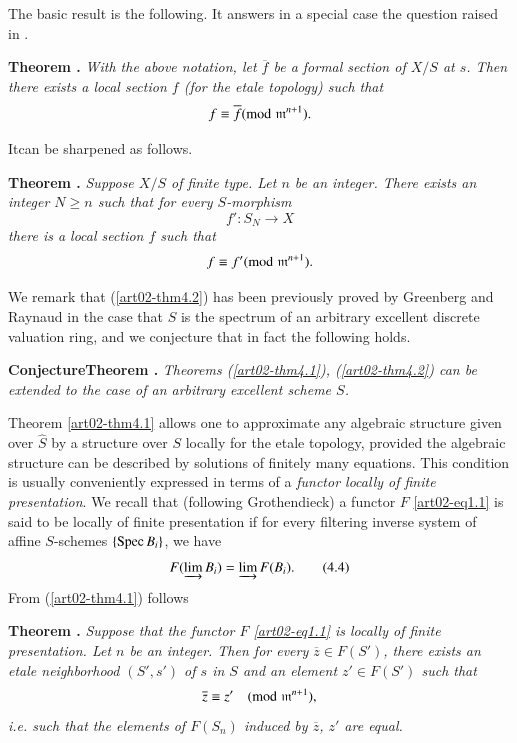The basic result is the following. It answers in a special case the question raised in \cite{art02-key3}.

\medskip
\noindent
{\bf Theorem .\label{art02-thm4.1}}
{\em With the above notation, let $\overline{f}$ be a formal section of $X/S$ at $s$. Then there exists a local section $f$ (for the etale topology) such that}
$$
f\equiv \overline{f}({\rm{mod}}\kern.3em \mathfrak{m}^{n+1}).
$$
\smallskip

It\pageoriginale can be sharpened as follows.

\medskip
\noindent
{\bf Theorem .\label{art02-thm4.2}}
{\em Suppose $X/S$ of finite type. Let $n$ be an integer. There exists an integer $N\geq n$ such that for every $S$-morphism}
$$
f':S_{N}\to X
$$
{\em there is a local section $f$ such that}
$$
f\equiv f'({\rm{mod}}\kern.3em \mathfrak{m}^{n+1}).
$$

We remark that (\ref{art02-thm4.2}) has been previously proved by Greenberg \cite{art02-key10} and Raynaud in the case that $S$ is the spectrum of an arbitrary excellent discrete valuation ring, and we conjecture that in fact the following holds.

\medskip
\noindent
{\bf ConjectureTheorem .\label{art02-conj4.3}}
{\em Theorems (\ref{art02-thm4.1}), (\ref{art02-thm4.2}) can be extended to the case of an arbitrary excellent scheme $S$.}
\smallskip

Theorem \ref{art02-thm4.1} allows one to approximate any algebraic structure given over $\widehat{S}$ by a structure over $S$ locally for the etale topology, provided the algebraic structure can be described by solutions of finitely many equations. This condition is usually conveniently expressed in terms of a {\em functor locally of finite presentation}. We recall that (following Grothendieck) a functor $F$ \eqref{art02-eq1.1} is said to be locally of finite presentation if for every filtering inverse system of affine $S$-schemes $\{\operatorname{Spec} B_{i}\}$, we have
\begin{equation*}
F(\varinjlim B_{i})=\varinjlim F(B_{i}).\tag{4.4}\label{art02-eq4.4}
\end{equation*}
From (\ref{art02-thm4.1}) follows

\medskip
\noindent
{\bf Theorem .\label{art02-thm4.5}}
{\em Suppose that the functor $F$ \eqref{art02-eq1.1} is locally of finite presentation. Let $n$ be an integer. Then for every $\overline{z}\in F(S')$, there exists an etale neighborhood $(S',s')$ of $s$ in $S$ and an element $z'\in F(S')$ such that}
$$
\overline{z}\equiv z'\quad ({\rm{mod}}\kern.3em \mathfrak{m}^{n+1}),
$$
{\em i.e. such that the elements of $F(S_{n})$ induced by $\overline{z}$, $z'$ are equal.}
\medskip

